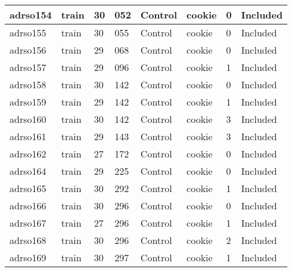 \begin{center}
\begin{longtable}{|l|l|l|l|l|l|l|l|}
adrso154  & train            & 30           & 052         & Control              & cookie          & 0                & Included      \\ \hline
adrso155  & train            & 30           & 055         & Control              & cookie          & 0                & Included      \\ \hline
adrso156  & train            & 29           & 068         & Control              & cookie          & 0                & Included      \\ \hline
adrso157  & train            & 29           & 096         & Control              & cookie          & 1                & Included      \\ \hline
adrso158  & train            & 30           & 142         & Control              & cookie          & 0                & Included      \\ \hline
adrso159  & train            & 29           & 142         & Control              & cookie          & 1                & Included      \\ \hline
adrso160  & train            & 30           & 142         & Control              & cookie          & 3                & Included      \\ \hline
adrso161  & train            & 29           & 143         & Control              & cookie          & 3                & Included      \\ \hline
adrso162  & train            & 27           & 172         & Control              & cookie          & 0                & Included      \\ \hline
adrso164  & train            & 29           & 225         & Control              & cookie          & 0                & Included      \\ \hline
adrso165  & train            & 30           & 292         & Control              & cookie          & 1                & Included      \\ \hline
adrso166  & train            & 30           & 296         & Control              & cookie          & 0                & Included      \\ \hline
adrso167  & train            & 27           & 296         & Control              & cookie          & 1                & Included      \\ \hline
adrso168  & train            & 30           & 296         & Control              & cookie          & 2                & Included      \\ \hline
adrso169  & train            & 30           & 297         & Control              & cookie          & 1                & Included      \\ \hline

\end{longtable}
\end{center}
